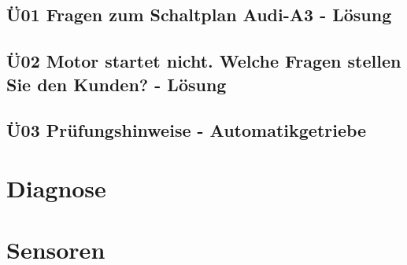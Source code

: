 \section{Ü01 Fragen zum Schaltplan Audi-A3 - Lösung}

\section{Ü02 Motor startet nicht. Welche Fragen stellen Sie den Kunden? - Lösung}

\section{Ü03 Prüfungshinweise - Automatikgetriebe}



\chapter{Diagnose}

\chapter{Sensoren}






%
%



%




